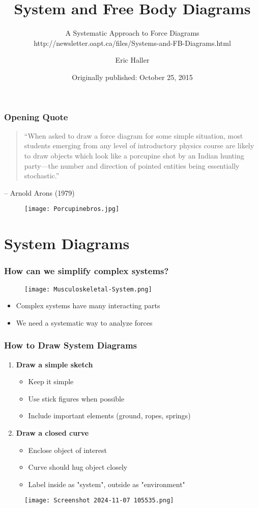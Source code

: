 \documentclass{beamer}
\title[System \& Free Body Diagrams]{System and Free Body Diagrams}
\subtitle{A Systematic Approach to Force Diagrams\\http://newsletter.oapt.ca/files/Systems-and-FB-Diagrams.html}
\author[E. Haller]{Eric Haller}
\date[2015]{Originally published: October 25, 2015}
\begin{document}
\frame{\titlepage}

\begin{frame}
\frametitle{Opening Quote}
\begin{quote}
``When asked to draw a force diagram for some simple situation, most students emerging from any level of introductory physics course are likely to draw objects which look like a porcupine shot by an Indian hunting party—the number and direction of pointed entities being essentially stochastic.''
\end{quote}
\pause
\vspace{0.5cm}
\hfill -- Arnold Arons (1979)
\pause
\begin{figure}[H]
    \centering
    \texttt{[image: Porcupinebros.jpg]}
\end{figure}
\end{frame}

\section{System Diagrams}

\begin{frame}
\frametitle{How can we simplify complex systems?}
\begin{figure}[H]
    \centering
    \texttt{[image: Musculoskeletal-System.png]}
\end{figure}
\pause
\begin{itemize}
    \item Complex systems have many interacting parts
    \pause
    \item We need a systematic way to analyze forces
\end{itemize}
\end{frame}

\begin{frame}
\frametitle{How to Draw System Diagrams}
\begin{enumerate}
    \item \textbf{Draw a simple sketch}
    \pause
    \begin{itemize}
        \item Keep it simple
        \item Use stick figures when possible
        \item Include important elements (ground, ropes, springs)
    \end{itemize}
    \pause
    \item \textbf{Draw a closed curve}
    \pause
    \begin{itemize}
        \item Enclose object of interest
        \item Curve should hug object closely
        \item Label inside as "system", outside as "environment"
    \end{itemize}
\end{enumerate}
\pause
\begin{figure}
    \centering
    \texttt{[image: Screenshot 2024-11-07 105535.png]}
\end{figure}

\end{frame}
\end{document}
